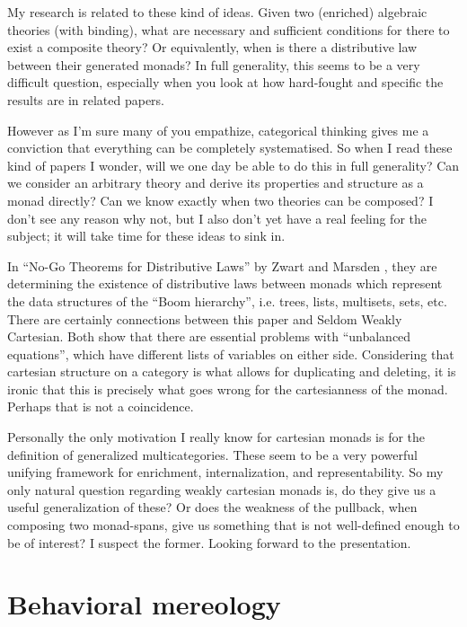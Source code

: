 \documentclass{amsart}
\begin{document}
My research is related to these kind of ideas. Given two (enriched) algebraic theories (with binding), what are necessary and sufficient conditions for there to exist a composite theory? Or equivalently, when is there a distributive law between their generated monads? In full generality, this seems to be a very difficult question, especially when you look at how hard-fought and specific the results are in related papers.

However as I'm sure many of you empathize, categorical thinking gives me a conviction that everything can be completely systematised. So when I read these kind of papers I wonder, will we one day be able to do this in full generality? Can we consider an arbitrary theory and derive its properties and structure as a monad directly? Can we know exactly when two theories can be composed? I don't see any reason why not, but I also don't yet have a real feeling for the subject; it will take time for these ideas to sink in.

In ``No-Go Theorems for Distributive Laws'' by Zwart and Marsden \cite{nogodistlaw}, they are determining the existence of distributive laws between monads which represent the data structures of the ``Boom hierarchy'', i.e. trees, lists, multisets, sets, etc. There are certainly connections between this paper and Seldom Weakly Cartesian. Both show that there are essential problems with ``unbalanced equations'', which have different lists of variables on either side. Considering that cartesian structure on a category is what allows for duplicating and deleting, it is ironic that this is precisely what goes wrong for the cartesianness of the monad. Perhaps that is not a coincidence.

Personally the only motivation I really know for cartesian monads is for the definition of generalized multicategories. These seem to be a very powerful unifying framework for enrichment, internalization, and representability. So my only natural question regarding weakly cartesian monads is, do they give us a useful generalization of these? Or does the weakness of the pullback, when composing two monad-spans, give us something that is not well-defined enough to be of interest? I suspect the former. Looking forward to the presentation.



\section{Behavioral mereology}
\label{sec:mereology}
\end{document}
